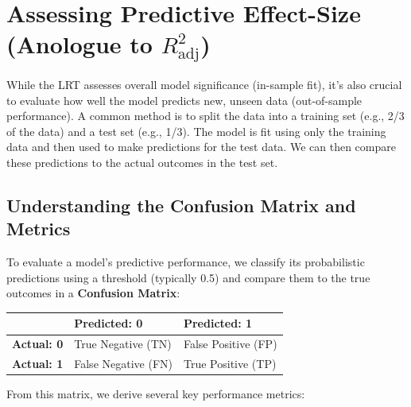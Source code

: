 \documentclass[
  letterpaper,
]{scrbook}
\begin{document}
\section{\texorpdfstring{Assessing Predictive Effect-Size (Anologue to
\(R^2_\mathrm{adj}\))}{Assessing Predictive Effect-Size (Anologue to R\^{}2\_\textbackslash mathrm\{adj\})}}\label{assessing-predictive-effect-size-anologue-to-r2_mathrmadj}

While the LRT assesses overall model significance (in-sample fit), it's
also crucial to evaluate how well the model predicts new, unseen data
(out-of-sample performance). A common method is to split the data into a
training set (e.g., 2/3 of the data) and a test set (e.g., 1/3). The
model is fit using only the training data and then used to make
predictions for the test data. We can then compare these predictions to
the actual outcomes in the test set.

\subsection{Understanding the Confusion Matrix and
Metrics}\label{understanding-the-confusion-matrix-and-metrics}

To evaluate a model's predictive performance, we classify its
probabilistic predictions using a threshold (typically 0.5) and compare
them to the true outcomes in a \textbf{Confusion Matrix}:

\begin{longtable}[]{@{}lll@{}}
\toprule\noalign{}
& \textbf{Predicted: 0} & \textbf{Predicted: 1} \\
\midrule\noalign{}
\endhead
\bottomrule\noalign{}
\endlastfoot
\textbf{Actual: 0} & True Negative (TN) & False Positive (FP) \\
\textbf{Actual: 1} & False Negative (FN) & True Positive (TP) \\
\end{longtable}

From this matrix, we derive several key performance metrics:
\end{document}
